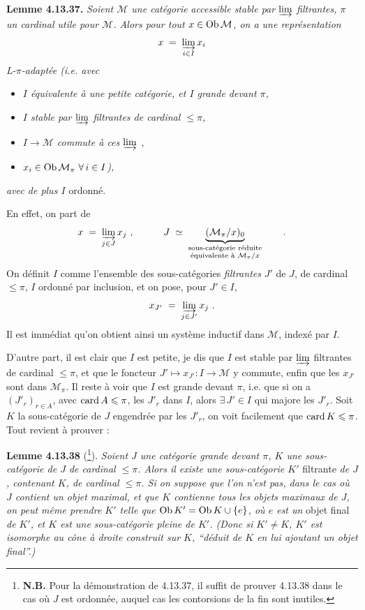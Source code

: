 \textbf{Lemme 4.13.37.} \textit{Soient $\mathcal{M}$ une catégorie}
\textit{accessible stable par $\varinjlim$ filtrantes, $\pi$ un cardinal utile pour $\mathcal{M}$. Alors pour tout $x \in \operatorname{Ob} \mathcal{M}$, on a une représentation}
\[ x \;=\; \varinjlim_{i\in I} x_i \]
\textit{L-$\pi$-adaptée (i.e. avec}
\begin{itemize}[leftmargin=2.5em]
\item[\textit{1)}] \textit{$I$ équivalente à une petite catégorie, et $I$ grande devant $\pi$,}
\item[\textit{2)}] \textit{$I$ stable par $\varinjlim$ filtrantes de cardinal $\leqslant \pi$,}
\item[\textit{3)}] \textit{$I \longrightarrow \mathcal{M}$ commute à ces $\varinjlim$ ,}
\item[\textit{d)}] \textit{$x_i \in \Ob \mathcal{M}_\pi \ \forall\, i \in I$),} %
\end{itemize}
\textit{avec de plus $I$} ordonné.

En effet, on part de
\[ x \;=\; \varinjlim_{j\in J} x_j \ , \qquad\quad J \;\simeq\; \underbrace{(\mathcal{M}_\pi/x)_0}_{\substack{\text{sous-catégorie réduite}\\ \text{équivalente à } \mathcal{M}_\pi/x}} \qquad . \]
On définit $I$ comme l'ensemble des sous-catégories \textit{filtrantes} $J'$ de $J$, de cardinal $\leqslant \pi$, $I$ ordonné par inclusion, et on pose, pour $J' \in I$,
\[ x_{J'} \;=\; \varinjlim_{j\in J'} x_j \ . \]
Il est immédiat qu'on obtient ainsi un système inductif dans $\mathcal{M}$, indexé par $I$.


D'autre part, il est clair que $I$ est petite, je dis que $I$ est stable par $\varinjlim$ filtrantes de cardinal $\leqslant \pi$, et que le foncteur $J' \longmapsto x_{J'} : I \longrightarrow \mathcal{M}$ y commute, enfin que les $x_{J'}$ sont dans $\mathcal{M}_\pi$. Il reste à voir que $I$ est grande devant $\pi$, i.e. que si on a $(J'_r)_{r\in A}$, avec $\operatorname{card} A \leqslant \pi$, les $J'_r$ dans $I$, alors $\exists\, J' \in I$ qui majore les $J'_r$. Soit $K$ la sous-catégorie de $J$ engendrée par les $J'_r$, on voit facilement que $\operatorname{card} K \leqslant \pi$. Tout revient à prouver :

\textbf{Lemme 4.13.38} (\footnote[160]{\textbf{N.B.} Pour la démonstration de 4.13.37, il suffit de prouver 4.13.38 dans le cas où $J$ est ordonnée, auquel cas les contorsions de la fin sont inutiles.}). \textit{Soient $J$ une catégorie grande devant $\pi$, $K$ une sous-catégorie de $J$ de cardinal $\leqslant \pi$. Alors il existe une sous-catégorie $K'$} filtrante \textit{de $J$, contenant $K$, de cardinal $\leqslant \pi$. Si on suppose que l'on n'est pas, dans le cas où $J$ contient un objet maximal, et que $K$ contienne tous les objets maximaux de $J$,}
\textit{on peut même prendre $K'$ telle que $\operatorname{Ob} K' = \operatorname{Ob} K \cup \{e\}$, où $e$ est un} objet final \textit{de $K'$, et $K$ est une sous-catégorie pleine de $K'$. (Donc si $K' \neq K$, $K'$ est isomorphe au cône à droite construit sur $K$, “déduit de $K$ en lui ajoutant un objet final”.)}

